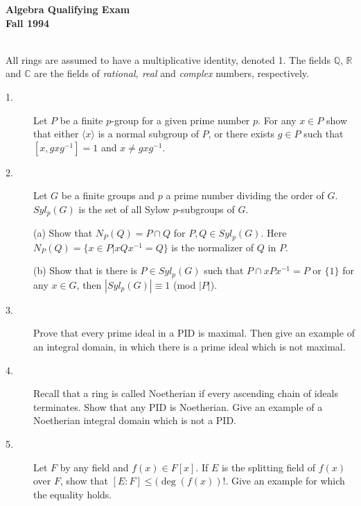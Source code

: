 \documentclass{article}
\def\R{\mathbb R}
\def\C{\mathbb C}
\def\Q{\mathbb Q}
\begin{document}






\begin{center}\begin{LARGE}
{\bf Algebra Qualifying Exam}\\ 
{\bf Fall 1994}\\ \end{LARGE}
\end{center}
\vspace{0.1in}
\noindent\hrulefill\\
All rings are assumed to have a multiplicative identity, denoted 1. The
fields $\Q$, $\R$ and $\C$ are the fields of {\it rational, real} and
{\it complex} numbers, respectively.

\begin{description}

\item[1.]
Let $P$ be a finite $p$-group for a given prime number $p$. For any
$x \in P$ show that either $\langle x \rangle$ is a normal subgroup of
$P$, or there
exists $g \in P$ such that $[x, gxg^{-1}] = 1$ and
$x \neq gxg^{-1}$.

\item[2.]
Let $G$ be a finite groups and $p$ a prime number dividing the order of $G$.
$Syl_p (G)$ is the set of all Sylow $p$-subgroups of $G$.

\item[\quad] (a)
Show that $N_P (Q) = P \cap Q$ for $P,Q \in Syl_p (G)$. Here
$N_P(Q) = \{x \in P |xQx^{-1} = Q\}$
is the normalizer of $Q$ in $P$.

\item[\quad] (b)
Show that is there is $P \in Syl_p (G)$ such that $P \cap xPx^{-1} = P$
or $\{1\}$ for any $x \in G$, then $|Syl_p (G) | \equiv 1$
(mod $|P|$).


\item[3.]
Prove that every prime ideal in a PID is maximal. Then give an example of an
integral domain, in which there is a prime ideal which is not maximal.

\item[4.]
Recall that a ring is called Noetherian if every ascending chain of ideals
terminates. Show that any PID is Noetherian. Give an example of a
Noetherian integral domain which is not a PID.

\item[5.]
Let $F$ by any field and $f(x) \in F[x]$. If $E$ is the splitting field of
$f(x)$ over $F$, show that $[E:F] \leq (\deg(f(x))!$. Give an example
for which the equality holds.


\end{description}
\end{document}
